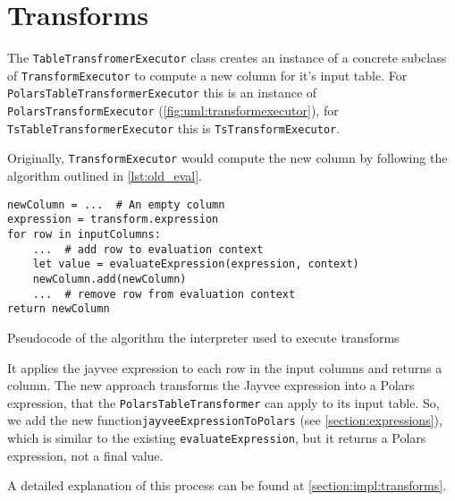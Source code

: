 \section{Transforms}
\label{section:transforms}
The \Verb|TableTransfromerExecutor| class creates an instance of a concrete subclass of \Verb|TransformExecutor| to compute a new column for it's input table.
For \Verb|PolarsTableTransformerExecutor| this is an instance of  \Verb|PolarsTransformExecutor| (\ref{fig:uml:transformexecutor}), for \Verb|TsTableTransformerExecutor| this is \Verb|TsTransformExecutor|.

Originally, \Verb|TransformExecutor| would compute the new column by following the algorithm outlined in \ref{lst:old_eval}.
\begin{listing}
	\begin{verbatim}
newColumn = ...  # An empty column
expression = transform.expression
for row in inputColumns:
	...  # add row to evaluation context
	let value = evaluateExpression(expression, context)
	newColumn.add(newColumn)
	...  # remove row from evaluation context
return newColumn
	\end{verbatim}
	\caption{Pseudocode of the algorithm the interpreter used to execute transforms}
	\label{lst:old_eval}
\end{listing}
It applies the jayvee expression to each row in the input columns and returns a column.
The new approach transforms the Jayvee expression into a Polars expression, that the \Verb|PolarsTableTransformer| can apply to its input table.
So, we add the new function\Verb|jayveeExpressionToPolars| (see \ref{section:expressions}), which is similar to the existing \Verb|evaluateExpression|, but it returns a Polars expression, not a final value.

A detailed explanation of this process can be found at \ref{section:impl:transforms}.

